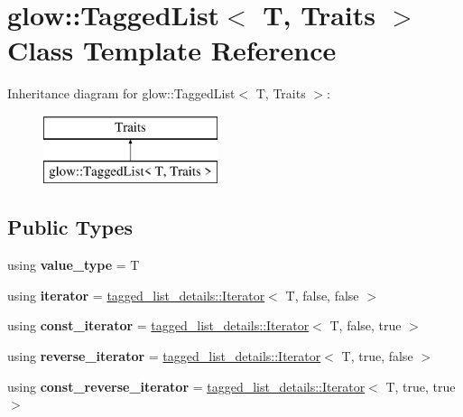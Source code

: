 \hypertarget{classglow_1_1_tagged_list}{}\section{glow\+:\+:Tagged\+List$<$ T, Traits $>$ Class Template Reference}
\label{classglow_1_1_tagged_list}
Inheritance diagram for glow\+:\+:Tagged\+List$<$ T, Traits $>$\+:\begin{figure}[H]
\begin{center}
\leavevmode
\includegraphics[height=2.000000cm]{classglow_1_1_tagged_list}
\end{center}
\end{figure}
\subsection*{Public Types}
\begin{DoxyCompactItemize}
\item 
\mbox{\label{classglow_1_1_tagged_list_a150b11f5a8073912a525efac3d999018}} 
using {\bfseries value\+\_\+type} = T
\item 
\mbox{\label{classglow_1_1_tagged_list_a4a6e7e8a2b54811bf1434d5a893c3812}} 
using {\bfseries iterator} = \hyperlink{classglow_1_1tagged__list__details_1_1_iterator}{tagged\+\_\+list\+\_\+details\+::\+Iterator}$<$ T, false, false $>$
\item 
\mbox{\label{classglow_1_1_tagged_list_a732da95cd855dc0dd163190951523c1f}} 
using {\bfseries const\+\_\+iterator} = \hyperlink{classglow_1_1tagged__list__details_1_1_iterator}{tagged\+\_\+list\+\_\+details\+::\+Iterator}$<$ T, false, true $>$
\item 
\mbox{\label{classglow_1_1_tagged_list_a5a2a3436696ea8c7392c32887ae5c97d}} 
using {\bfseries reverse\+\_\+iterator} = \hyperlink{classglow_1_1tagged__list__details_1_1_iterator}{tagged\+\_\+list\+\_\+details\+::\+Iterator}$<$ T, true, false $>$
\item 
\mbox{\label{classglow_1_1_tagged_list_ac64fde0b14fd7a606b3a5c3a44b999a4}} 
using {\bfseries const\+\_\+reverse\+\_\+iterator} = \hyperlink{classglow_1_1tagged__list__details_1_1_iterator}{tagged\+\_\+list\+\_\+details\+::\+Iterator}$<$ T, true, true $>$
\end{DoxyCompactItemize}
